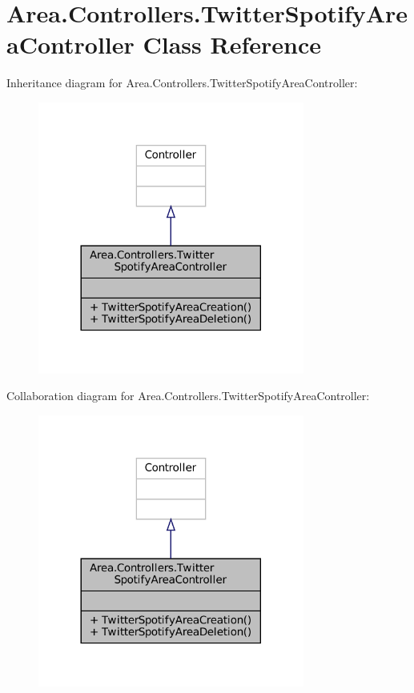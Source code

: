 \hypertarget{classArea_1_1Controllers_1_1TwitterSpotifyAreaController}{}\section{Area.\+Controllers.\+Twitter\+Spotify\+Area\+Controller Class Reference}
\label{classArea_1_1Controllers_1_1TwitterSpotifyAreaController}


Inheritance diagram for Area.\+Controllers.\+Twitter\+Spotify\+Area\+Controller\+:
\nopagebreak
\begin{figure}[H]
\begin{center}
\leavevmode
\includegraphics[width=248pt]{classArea_1_1Controllers_1_1TwitterSpotifyAreaController__inherit__graph}
\end{center}
\end{figure}


Collaboration diagram for Area.\+Controllers.\+Twitter\+Spotify\+Area\+Controller\+:
\nopagebreak
\begin{figure}[H]
\begin{center}
\leavevmode
\includegraphics[width=248pt]{classArea_1_1Controllers_1_1TwitterSpotifyAreaController__coll__graph}
\end{center}
\end{figure}
